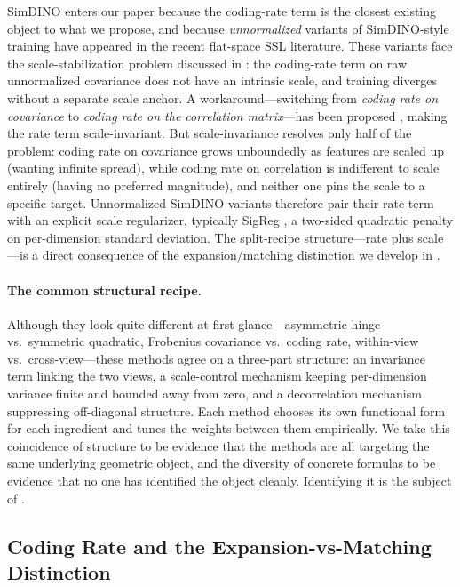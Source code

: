 SimDINO enters our paper because the coding-rate term is the closest existing object to what we propose, and because \emph{unnormalized} variants of SimDINO-style training have appeared in the recent flat-space SSL literature. These variants face the scale-stabilization problem discussed in : the coding-rate term on raw unnormalized covariance does not have an intrinsic scale, and training diverges without a separate scale anchor. A workaround---switching from \emph{coding rate on covariance} to \emph{coding rate on the correlation matrix}---has been proposed \citep{kacker2025correlation_rate}, making the rate term scale-invariant. But scale-invariance resolves only half of the problem: coding rate on covariance grows unboundedly as features are scaled up (wanting infinite spread), while coding rate on correlation is indifferent to scale entirely (having no preferred magnitude), and neither one pins the scale to a specific target. Unnormalized SimDINO variants therefore pair their rate term with an explicit scale regularizer, typically SigReg \citep{schaeffer2024sigreg}, a two-sided quadratic penalty on per-dimension standard deviation. The split-recipe structure---rate plus scale---is a direct consequence of the expansion/matching distinction we develop in .

\paragraph{The common structural recipe.}
Although they look quite different at first glance---asymmetric hinge vs.\ symmetric quadratic, Frobenius covariance vs.\ coding rate, within-view vs.\ cross-view---these methods agree on a three-part structure: an invariance term linking the two views, a scale-control mechanism keeping per-dimension variance finite and bounded away from zero, and a decorrelation mechanism suppressing off-diagonal structure. Each method chooses its own functional form for each ingredient and tunes the weights between them empirically. We take this coincidence of structure to be evidence that the methods are all targeting the same underlying geometric object, and the diversity of concrete formulas to be evidence that no one has identified the object cleanly. Identifying it is the subject of .

\subsection{Coding Rate and the Expansion-vs-Matching Distinction}
\label{sec:code_rate_expansion}

